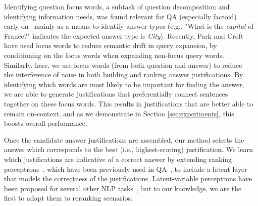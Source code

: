Identifying question focus words, a subtask of question decomposition and identifying information needs, was found relevant for QA (especially factoid) early on~\cite[inter alia]{Harabagiu:00,Moldovan:2003:PIE:763693.763694} mainly as a means to identify answer types (e.g., "What is the {\em capital} of France?" indicates the expected answer type is \emph{City}).  
Recently, Park and Croft~\citeyear{Park:2015} have used focus words to reduce semantic drift in query expansion, by conditioning on the focus words when expanding non-focus query words.
Similarly, here, we use focus words (from both question and answer) to reduce the interference of noise in both building and ranking answer justifications.  By identifying which words are most likely to be important for finding the answer, we are able to generate justifications that preferentially connect sentences together on these focus words.  This results in justifications that are better able to remain on-context, and as we demonstrate in Section \ref{sec:experiments}, this boosts overall performance. 

Once the candidate answer justifications are assembled, our method selects the answer which corresponds to the best (i.e., highest-scoring) justification.  We learn which justifications are indicative of a correct answer by extending ranking perceptrons~\cite{Shen:Joshi:2005}, which have been previously used in QA~\cite{Surdeanu:11}, to include a latent layer that models the correctness of the justifications. Latent-variable perceptrons have been proposed for several other NLP tasks~\cite{liang2006end,zettlemoyer2007online,sun2009latent,hoffmann2011knowledge,fernandes2012latent,bjorkelund2014learning}, but to our knowledge, we are the first to adapt them to reranking scenarios. 

